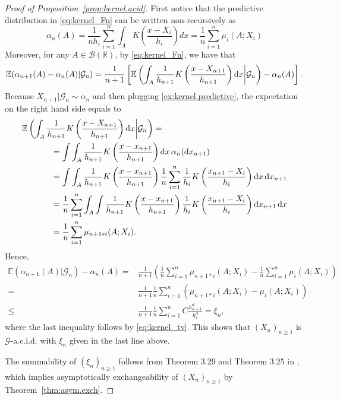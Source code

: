 \documentclass{article}
\theoremstyle{definition}
\newcommand{\di}{{\rm d}}
\renewcommand{\&}{and}
\begin{document}
\begin{proof}[Proof of Proposition~\ref{prop:kernel.acid}] First notice that the predictive distribution in \eqref{eq:kernel_Fn} can be written non-recursively as
	\begin{equation} \label{ex:kernel.predictive}
		\alpha_{n}(A)= \frac{1}{n h_{i}}\sum_{i=1}^{n}\int_{A} K\left( \frac{x- X_{i}}{h_{i}} \right)dx = \frac{1}{n}\sum_{i=1}^{n} \mu_i(A;X_i)
	\end{equation}
	Moreover, for any $A\in \mathcal{B}(\mathbb{R})$, by \eqref{eq:kernel_Fn}, we have that
	\begin{align*}
		\mathbb{E} (\alpha_{n+1}(A)-\alpha_{n}(A)|\mathcal{G}_n)= \frac{1}{n+1} \left[\mathbb{E} \left( \int_A \frac{1}{h_{n+1}} K\left(\frac{x-X_{n+1}}{h_{n+1}}\right) \di x \bigg|\mathcal{G}_n \right) - \alpha_{n}(A)\right].
	\end{align*}
	Because $X_{n+1}|\mathcal{G}_{n}\sim \alpha_{n}$ and then plugging \eqref{ex:kernel.predictive}, the expectation on the right hand side equals to
	\begin{align*}
		\mathbb{E} &\left( \int_A \frac{1}{h_{n+1}} K\left(\frac{x-X_{n+1}}{h_{n+1}}\right) \di x \bigg|\mathcal{G}_n \right)= \\
        &\hspace{1cm}=\int \int_A \frac{1}{h_{n+1}} K\left(\frac{x-x_{n+1}}{h_{n+1}}\right) \di x  \, \alpha_n(\di x_{n+1}) \\
		&\hspace{1cm}=\int \int_A \frac{1}{h_{n+1}} K\left(\frac{x-x_{n+1}}{h_{n+1}}\right) \frac{1}{n}\sum_{i=1}^n \frac{1}{h_i}  K\left(\frac{x_{n+1}-X_i}{h_{i}}\right) \di x \, \di x_{n+1} \\
		&\hspace{1cm}= \frac{1}{n}\sum_{i=1}^n  \int_A \int  \frac{1}{h_{n+1}} K\left(\frac{x-x_{n+1}}{h_{n+1}}\right) \frac{1}{h_i}  K\left(\frac{x_{n+1}-X_i}{h_{i}}\right) \di x_{n+1} \, \di x\\
		&\hspace{1cm}=\frac{1}{n}\sum_{i=1}^n \mu_{n+1*i}(A;X_i).
	\end{align*}
	Hence,
	\begin{align*}
		\mathbb{E} (\alpha_{n+1}(A)|\mathcal{G}_n)-\alpha_{n}(A)=& \frac{1}{n+1} \left(\frac{1}{n}\sum_{i=1}^{n} \mu_{n+1*i}(A;X_i) - \frac{1}{n}\sum_{i=1}^{n} 	\mu_{i}(A;X_i) \right)\\
		= & \frac{1}{n+1} \frac{1}{n}\sum_{i=1}^{n} \left( \mu_{n+1*i}(A;X_i) - 
		\mu_{i}(A;X_i) \right)\\
		\leq & \frac{1}{n+1} \frac{1}{n}\sum_{i=1}^n C \frac{h^d_{n+1}}{h^d_{i}}= \xi_{n},
	\end{align*}
where the last inequality follows by  \eqref{eq:kernel_tv}. This shows that $(X_n)_{n\geq 1}$ is $\mathcal{G}$-a.c.i.d.  with $\xi_n$ given in the last line above.
	
	\noindent The summability of $(\xi_n)_{n\geq 1}$ follows from  Theorem 3.29 and Theorem 3.25 in \cite{rudin1964principles}, which implies asymptotically exchangeability of $(X_n)_{n\geq 1}$ by Theorem~\ref{thm:asym.exch}.
\end{proof}
\end{document}
